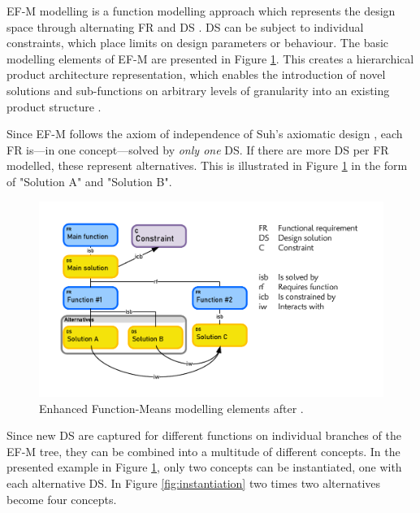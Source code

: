 \documentclass[aerospace,article,submit,moreauthors,pdftex]{Definitions/mdpi}
\begin{document}
{%
\Acf{EF-M} modelling is a function modelling approach which represents the design space through alternating \acf{FR} and \acf{DS} \cite{Schachinger2000}.
\Ac{DS} can be subject to individual constraints, which place limits on design parameters or behaviour.
The basic modelling elements of \ac{EF-M} are presented in Figure \ref{fig:EFM}.
This creates a hierarchical product architecture representation, which enables the introduction of novel solutions and sub-functions on arbitrary levels of granularity into an existing product structure \cite{Muller2020}.

Since \ac{EF-M} follows the axiom of independence of Suh's axiomatic design \cite{Suh1990}, each \ac{FR} is---in one concept---solved by \textit{only one} \ac{DS}. 
If there are more \ac{DS} per \ac{FR} modelled, these represent alternatives.
This is illustrated in Figure \ref{fig:EFM} in the form of "Solution A" and "Solution B".

\begin{figure}[ht]
    \centering
    \includegraphics[width=.8\textwidth]{figures/pdf/efm_basics.pdf}    
        \caption{Enhanced Function-Means modelling elements after \cite{Schachinger2000}.}
    \label{fig:EFM}
\end{figure}

Since new \ac{DS} are captured for different functions on individual branches of the EF-M tree, they can be combined into a multitude of different concepts.
In the presented example in Figure \ref{fig:EFM}, only two concepts can be instantiated, one with each alternative \ac{DS}.
In Figure \ref{fig:instantiation} two times two alternatives become four concepts.

}
\end{document}
